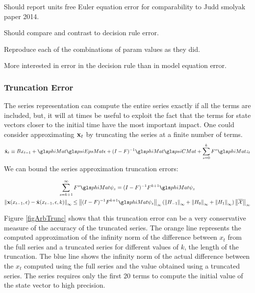 \documentclass[12pt]{article}
\begin{document}
{\color{blue}
Should report units free Euler equation error for comparability to   Judd smolyak paper 2014.

Should compare and contrast to decision rule error.

Reproduce each of the combinations of param values as they did.

More interested in error in the decision rule than in model equation error.
}

\subsubsection{Truncation Error}


The series representation can compute the entire series exactly
if all the terms are included, but, it will at times be useful to exploit the fact that
the terms for state vectors closer 
to the initial time have the most important impact.
One could consider approximating  $\mathbf{x}_t$ by 
truncating the series  at a finite number of terms.
 	 \begin{gather}
 	 \xWOargK_t \equiv B x_{t-1}+ \phiMat \psiEpsMat\epsilon  + (I - F)^{-1} \phiMat \psiCMat + \sum_{s=0}^k F^s \phiMat z_{t}\label{theTruncSeries}
 \end{gather}
We can bound the  series approximation truncation errors:

    \begin{gather}
      \label{eq:1}
\sum_{s=k+1}^{\infty} F^s \phiMat \psi_z = (I -F)^{-1} F^{k+1}\phiMat \psi_z       \\
\infNorm{\xWarg-\xWargK} \le \infNorm{(I -F)^{-1} F^{k+1}\phiMat \psi_z} \left ( \infNorm{H_{-1} }+ \infNorm{H_{0} }+ \infNorm{H_{1} } \right )\infNorm{\overline{\mathcal{X}}}
    \end{gather}


 Figure \ref{figArbTrunc} shows
that this truncation error can be  a very conservative measure of the accuracy
of the truncated series.  The orange line represents the computed approximation of
the infinity norm of the difference between $x_t$ from the full series and a truncated series for different values of $k$, the length of the truncation.  The blue line shows the infinity norm of the actual difference between the $x_t$ computed using the full series and the value obtained using a truncated series.  The series requires only the first 20 terms to compute
the initial value of the state vector to high precision. 
\end{document}
